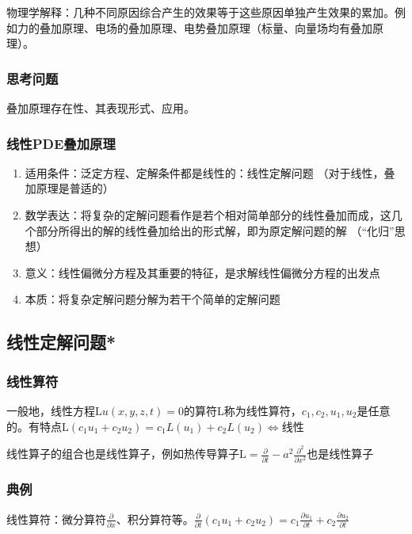 物理学解释：几种不同原因综合产生的效果等于这些原因单独产生效果的累加。例如力的叠加原理、电场的叠加原理、电势叠加原理（标量、向量场均有叠加原理）。

\subsubsection{思考问题}

叠加原理存在性、其表现形式、应用。

\subsubsection{线性PDE叠加原理}
\begin{enumerate}
	\item 适用条件：泛定方程、定解条件都是线性的：线性定解问题 （对于线性，叠加原理是普适的）
	\item 数学表达：将复杂的定解问题看作是若个相对简单部分的线性叠加而成，这几个部分所得出的解的线性叠加给出的形式解，即为原定解问题的解 （“化归”思想）
	\item 意义：线性偏微分方程及其重要的特征，是求解线性偏微分方程的出发点
	\item 本质：将复杂定解问题分解为若干个简单的定解问题
\end{enumerate}

\subsection{线性定解问题*}

\subsubsection{线性算符}

一般地，线性方程\(\mathrm{L}u(x,y,z,t)=0\)的算符L称为线性算符，\(c_1,c_2,u_1,u_2\)是任意的。有特点\(\mathrm{L}(c_1u_1+c_2u_2)=c_1L(u_1)+c_2L(u_2)\Leftrightarrow\)线性

线性算子的组合也是线性算子，例如热传导算子\(\mathrm{L}=\frac{\partial}{\partial t}-a^2\frac{\partial^2}{\partial x^2}\)也是线性算子

\subsubsection{典例}

线性算符：微分算符\(\frac{\partial}{\partial x}\)、积分算符等。\(\frac{\partial}{\partial t}\left(c_1u_1+c_2u_2\right)=c_1\frac{\partial u_1}{\partial t}+c_2\frac{\partial u_2}{\partial t}\)

